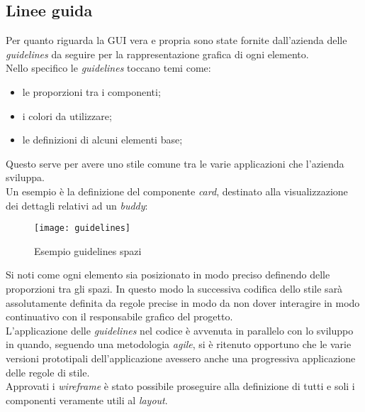 \subsection{Linee guida}
Per quanto riguarda la GUI vera e propria sono state fornite dall'azienda delle 
\emph{guidelines} da seguire per la rappresentazione grafica di ogni elemento. \\
Nello specifico le \emph{guidelines} toccano temi come:
\begin{itemize}
	\item le proporzioni tra i componenti;
	\item i colori da utilizzare;
	\item le definizioni di alcuni elementi base;
\end{itemize}
Questo serve per avere uno stile comune tra le varie applicazioni che 
l'azienda sviluppa. \\
Un esempio è la definizione del componente \emph{card}, destinato alla 
visualizzazione dei dettagli relativi ad un \emph{buddy}:
\begin{figure}[H] 
	\centering
	\texttt{[image: guidelines]}
	\caption{Esempio guidelines spazi}
\end{figure}
Si noti come ogni elemento sia posizionato in modo preciso definendo delle 
proporzioni tra gli spazi. In questo modo la successiva codifica dello stile sarà 
assolutamente definita da regole precise in modo da non dover interagire in modo 
continuativo con il responsabile grafico del progetto. \\
L'applicazione delle \emph{guidelines} nel codice è avvenuta in parallelo con lo sviluppo 
in quando, seguendo una metodologia \emph{agile}, si è ritenuto opportuno che le varie 
versioni prototipali dell'applicazione avessero anche una progressiva applicazione 
delle regole di stile.\\
Approvati i \emph{wireframe} è stato possibile proseguire alla definizione di tutti 
e soli i componenti veramente utili al \emph{layout}.
\newpage
